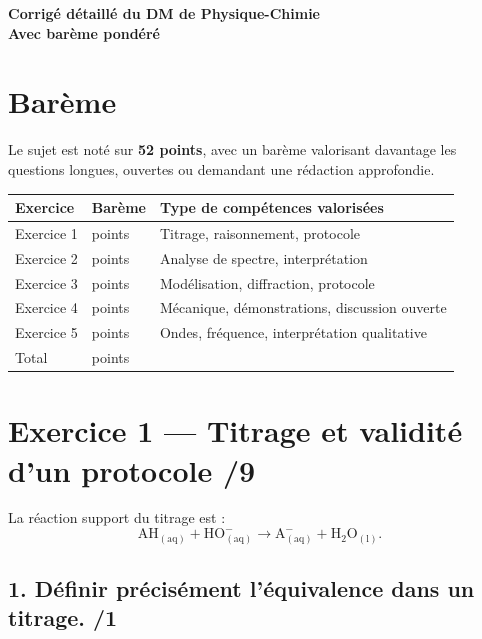 \documentclass[11pt,a4paper]{article}
\begin{document}
\begin{center}
    {\LARGE \textbf{Corrigé détaillé du DM de Physique-Chimie}}\\[0.5em]
    {\large \textbf{Avec barème pondéré}}\\[0.5em]
\end{center}

\section*{Barème }

Le sujet est noté sur \textbf{52 points}, avec un barème valorisant davantage les questions longues, ouvertes ou demandant une rédaction approfondie.

\begin{center}
\renewcommand{\arraystretch}{1.3}
\begin{tabular}{|>{\centering\arraybackslash}m{4cm}|>{\centering\arraybackslash}m{3cm}|>{\centering\arraybackslash}m{5cm}|}
\hline
\textbf{Exercice} & \textbf{Barème} & \textbf{Type de compétences valorisées} \\
\hline
Exercice 1 & 9 points & Titrage, raisonnement, protocole \\
\hline
Exercice 2 & 10 points & Analyse de spectre, interprétation \\
\hline
Exercice 3 & 10 points & Modélisation, diffraction, protocole \\
\hline
Exercice 4 & 17 points & Mécanique, démonstrations, discussion ouverte \\
\hline
Exercice 5 & 6 points & Ondes, fréquence, interprétation qualitative \\
\hline
Total & 52 points &  \\
\hline
\end{tabular}
\end{center}

\section*{Exercice 1 --- Titrage et validité d'un protocole \hfill /9}

La réaction support du titrage est :
\[
\mathrm{AH_{(aq)} + HO^-_{(aq)} \rightarrow A^-_{(aq)} + H_2O_{(l)}}.
\]

\subsection*{1. Définir précisément l'équivalence dans un titrage. \hfill /1}
\end{document}

